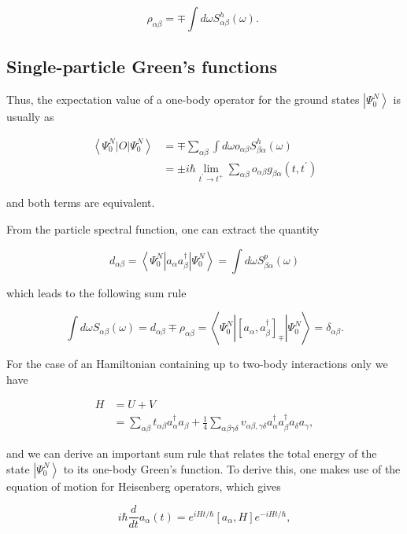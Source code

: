 {$$
\rho_{\alpha \beta}=\mp \int d \omega S_{\alpha \beta}^{h}(\omega) \text {. }
$$


\subsection{Single-particle Green's functions}

Thus, the expectation value of a one-body operator for the
ground states $\left|\Psi_{0}^{N}\right\rangle$ is usually as

$$
\begin{aligned}
\left\langle\Psi_{0}^{N}|O| \Psi_{0}^{N}\right\rangle & =\mp \sum_{\alpha \beta} \int d \omega o_{\alpha \beta} S_{\beta \alpha}^{h}(\omega) \\
& = \pm i \hbar \lim _{t^{\prime} \rightarrow t^{+}} \sum_{\alpha \beta} o_{\alpha \beta} g_{\beta \alpha}\left(t, t^{\prime}\right)
\end{aligned}
$$

and both terms are equivalent.


From the particle spectral function, one can extract the quantity

$$
d_{\alpha \beta}=\left\langle\Psi_{0}^{N}\left|a_{\alpha} a_{\beta}^{\dagger}\right| \Psi_{0}^{N}\right\rangle=\int d \omega S_{\beta \alpha}^{p}(\omega)
$$

which leads to the following sum rule

$$
\int d \omega S_{\alpha \beta}(\omega)=d_{\alpha \beta} \mp \rho_{\alpha \beta}=\left\langle\Psi_{0}^{N}\left|\left[a_{\alpha}, a_{\beta}^{\dagger}\right]_{\mp}\right| \Psi_{0}^{N}\right\rangle=\delta_{\alpha \beta} .
$$


For the case of an Hamiltonian containing up to two-body interactions only we have

$$
\begin{aligned}
H & =U+V \\
& =\sum_{\alpha \beta} t_{\alpha \beta} a_{\alpha}^{\dagger} a_{\beta}+\frac{1}{4} \sum_{\alpha \beta \gamma \delta} v_{\alpha \beta, \gamma \delta} a_{\alpha}^{\dagger} a_{\beta}^{\dagger} a_{\delta} a_{\gamma},
\end{aligned}
$$

and we can derive an important sum rule that relates the total energy
of the state $\left|\Psi_{0}^{N}\right\rangle$ to its one-body Green's
function. To derive this, one makes use of the equation of motion for
Heisenberg operators, which gives

$$
i \hbar \frac{d}{d t} a_{\alpha}(t)=e^{i H t / \hbar}\left[a_{\alpha}, H\right] e^{-i H t / \hbar},
$$

}
